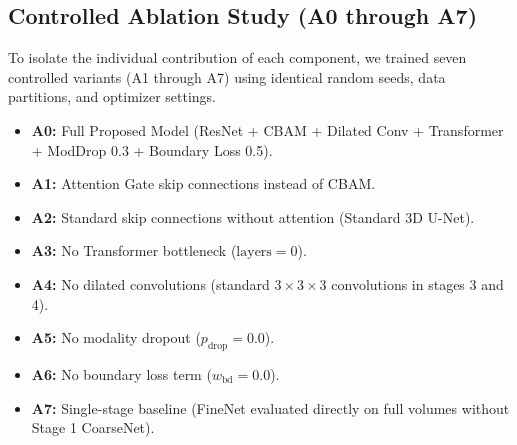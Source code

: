 \documentclass[12pt, a4paper]{article}
\begin{document}
\subsection{Controlled Ablation Study (A0 through A7)}
To isolate the individual contribution of each component, we trained seven controlled variants (A1 through A7) using identical random seeds, data partitions, and optimizer settings.
\begin{itemize}[leftmargin=*, itemsep=2pt]
    \item \textbf{A0:} Full Proposed Model (ResNet + CBAM + Dilated Conv + Transformer + ModDrop 0.3 + Boundary Loss 0.5).
    \item \textbf{A1:} Attention Gate skip connections instead of CBAM.
    \item \textbf{A2:} Standard skip connections without attention (Standard 3D U-Net).
    \item \textbf{A3:} No Transformer bottleneck ($\text{layers} = 0$).
    \item \textbf{A4:} No dilated convolutions (standard $3\times 3\times 3$ convolutions in stages 3 and 4).
    \item \textbf{A5:} No modality dropout ($p_{\text{drop}} = 0.0$).
    \item \textbf{A6:} No boundary loss term ($w_{\text{bd}} = 0.0$).
    \item \textbf{A7:} Single-stage baseline (FineNet evaluated directly on full volumes without Stage 1 CoarseNet).
\end{itemize}
\end{document}
